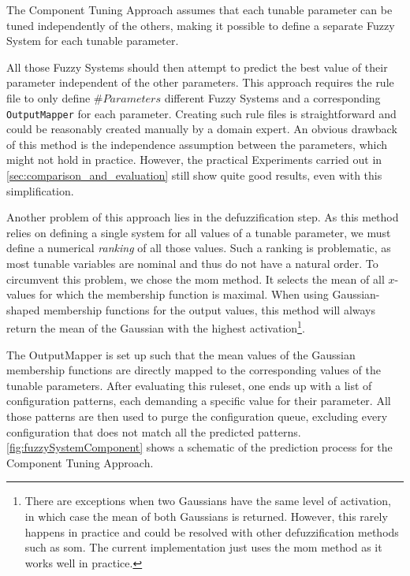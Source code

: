 The Component Tuning Approach assumes that each tunable parameter can be tuned independently of the others, making it possible to define a separate Fuzzy System for each tunable parameter.

All those Fuzzy Systems should then attempt to predict the best value of their parameter independent of the other parameters. This approach requires the rule file to only define $\#Parameters$ different Fuzzy Systems and a corresponding \texttt{OutputMapper} for each parameter. Creating such rule files is straightforward and could be reasonably created manually by a domain expert. An obvious drawback of this method is the independence assumption between the parameters, which might not hold in practice. However, the practical Experiments carried out in \autoref{sec:comparison_and_evaluation} still show quite good results, even with this simplification.

Another problem of this approach lies in the defuzzification step. As this method relies on defining a single system for all values of a tunable parameter, we must define a numerical \emph{ranking} of all those values. Such a ranking is problematic, as most tunable variables are nominal and thus do not have a natural order. To circumvent this problem, we chose the \gls{mom} method. It selects the mean of all $x$-values for which the membership function is maximal. When using Gaussian-shaped membership functions for the output values, this method will always return the mean of the Gaussian with the highest activation\footnote{There are exceptions when two Gaussians have the same level of activation, in which case the mean of both Gaussians is returned. However, this rarely happens in practice and could be resolved with other defuzzification methods such as \gls{som}. The current implementation just uses the \gls{mom} method as it works well in practice.}.

The OutputMapper is set up such that the mean values of the Gaussian membership functions are directly mapped to the corresponding values of the tunable parameters. After evaluating this ruleset, one ends up with a list of configuration patterns, each demanding a specific value for their parameter. All those patterns are then used to purge the configuration queue, excluding every configuration that does not match all the predicted patterns. \autoref{fig:fuzzySystemComponent} shows a schematic of the prediction process for the Component Tuning Approach.



